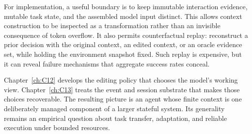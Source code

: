 For implementation, a useful boundary is to keep immutable interaction evidence, mutable task state, and the assembled model input distinct. This allows context construction to be inspected as a transformation rather than an invisible consequence of token overflow. It also permits counterfactual replay: reconstruct a prior decision with the original context, an edited context, or an oracle evidence set, while holding the environment snapshot fixed. Such replay is expensive, but it can reveal failure mechanisms that aggregate success rates conceal.

Chapter~\ref{ch:C12} develops the editing policy that chooses the model's working view. Chapter~\ref{ch:C13} treats the event and session substrate that makes those choices recoverable. The resulting picture is an agent whose finite context is one deliberately managed component of a larger stateful system. Its generality remains an empirical question about task transfer, adaptation, and reliable execution under bounded resources.
